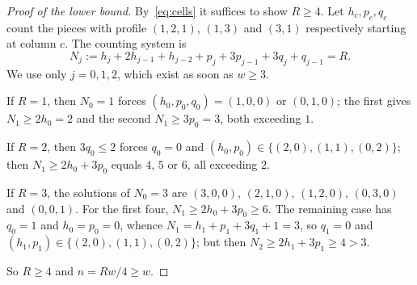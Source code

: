 \documentclass[11pt,a4paper]{article}
\theoremstyle{plain}
\theoremstyle{definition}
\theoremstyle{remark}
\begin{document}
\begin{proof}[Proof of the lower bound]
By~\eqref{eq:cells} it suffices to show $R \geq 4$. Let $h_c, p_c, q_c$ count the
pieces with profile $(1,2,1)$, $(1,3)$ and $(3,1)$ respectively starting at column
$c$. The counting system is
\[
N_j := h_j + 2h_{j-1} + h_{j-2} + p_j + 3p_{j-1} + 3q_j + q_{j-1} = R .
\]
We use only $j = 0, 1, 2$, which exist as soon as $w \geq 3$.

If $R = 1$, then $N_0 = 1$ forces $(h_0,p_0,q_0) = (1,0,0)$ or $(0,1,0)$; the first
gives $N_1 \geq 2h_0 = 2$ and the second $N_1 \geq 3p_0 = 3$, both exceeding $1$.

If $R = 2$, then $3q_0 \leq 2$ forces $q_0 = 0$ and $(h_0,p_0) \in
\{(2,0),(1,1),(0,2)\}$; then $N_1 \geq 2h_0 + 3p_0$ equals $4$, $5$ or $6$, all
exceeding $2$.

If $R = 3$, the solutions of $N_0 = 3$ are $(3,0,0)$, $(2,1,0)$, $(1,2,0)$,
$(0,3,0)$ and $(0,0,1)$. For the first four, $N_1 \geq 2h_0 + 3p_0 \geq 6$. The
remaining case has $q_0 = 1$ and $h_0 = p_0 = 0$, whence $N_1 = h_1 + p_1 + 3q_1 + 1
= 3$, so $q_1 = 0$ and $(h_1,p_1) \in \{(2,0),(1,1),(0,2)\}$; but then $N_2 \geq
2h_1 + 3p_1 \geq 4 > 3$.

So $R \geq 4$ and $n = Rw/4 \geq w$.
\end{proof}
\end{document}
